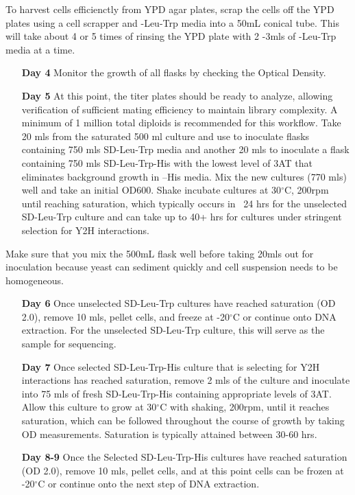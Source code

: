 \documentclass[11pt,fleqn]{book} %
\begin{document}
\begin{remark}
    To harvest cells efficienctly from YPD agar plates, scrap the cells off the YPD plates using a cell scrapper and -Leu-Trp media into a 50mL conical tube.  This will take about 4 or 5 times of rinsing the YPD plate with 2 -3mls of -Leu-Trp media at a time. 
\end{remark}

\begin{enumerate}[leftmargin=0.8in]
    \item[\textbf{Day 4}] Monitor the growth of all flasks by checking the Optical Density.
    \item[\textbf{Day 5}] At this point, the titer plates should be ready to analyze, allowing verification of sufficient mating efficiency to maintain library complexity.  A minimum of 1 million total diploids is recommended for this workflow. Take 20 mls from the saturated 500 ml culture and use to inoculate flasks containing 750 mls SD-Leu-Trp media and another 20 mls to inoculate a flask containing 750 mls SD-Leu-Trp-His with the lowest level of 3AT that eliminates background growth in –His media. Mix the new cultures (770 mls) well and take an initial OD600.  Shake incubate cultures at 30$^\circ$C, 200rpm until reaching saturation, which typically occurs in ~24 hrs for the unselected SD-Leu-Trp culture and can take up to 40+ hrs for cultures under stringent selection for Y2H interactions.   
\end{enumerate}


\begin{remark}
    Make sure that you mix the 500mL flask well before taking 20mls out for inoculation because yeast can sediment quickly and cell suspension needs to be homogeneous. 
\end{remark}


\begin{enumerate}[leftmargin=0.8in]
    \item[\textbf{Day 6}] Once unselected SD-Leu-Trp cultures have reached saturation (OD 2.0), remove 10 mls, pellet cells, and freeze at -20$^\circ$C or continue onto DNA extraction.  For the unselected SD-Leu-Trp culture, this will serve as the sample for sequencing.  
    \item[\textbf{Day 7}] Once selected SD-Leu-Trp-His culture that is selecting for Y2H interactions has reached saturation, remove 2 mls of the culture and inoculate into 75 mls of fresh SD-Leu-Trp-His containing appropriate levels of 3AT. Allow this culture to grow at 30$^\circ$C with shaking, 200rpm, until it reaches saturation, which can be followed throughout the course of growth by taking OD measurements. Saturation is typically attained between 30-60 hrs.  
    \item[\textbf{Day 8-9}] Once the Selected SD-Leu-Trp-His cultures have reached saturation (OD 2.0), remove 10 mls, pellet cells, and at this point cells can be frozen at -20$^\circ$C or continue onto the next step of DNA extraction.    
\end{enumerate}
\end{document}
